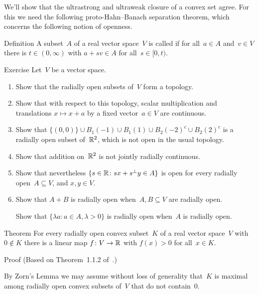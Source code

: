 \documentclass[a]{subfiles}
\begin{document}
\begin{parsec}%
\begin{point}%
We'll show that the ultrastrong and ultraweak closure
of a convex set agree. 
For this we need the following proto-Hahn--Banach separation theorem,
which concerns the following notion of openness.
\end{point}
\begin{point}{Definition}%
A subset~$A$ of a real vector space~$V$ 
is called 
if for all~$a\in A$ and~$v\in V$
there is $t\in (0,\infty)$
with $a+sv\in A$ for all~$s\in [0,t)$.
\end{point}
\begin{point}{Exercise}%
Let~$V$ be a vector space.
\begin{enumerate}
\item
Show that the radially open subsets of~$V$ form a topology.
\item
Show that with respect to this topology,
scalar multiplication and translations $x\mapsto x+a$
by a fixed vector~$a\in V$ are continuous.
\item
Show that $\{(0,0)\}\cup B_1(-1)\cup B_1(1)\cup B_2(-2)^c\cup B_2(2)^c$
is a radially open subset of~$\mathbb{R}^2$, 
which is not open
in the usual topology.


\item
Show that addition on~$\mathbb{R}^2$ is not jointly radially continuous.
\item
Show that nevertheless $\{s\in \mathbb{R} \colon sx+s^\perp y\in A\}$
is open for every radially open~$A\subseteq V$, and $x,y\in V$.
\item
Show that $A+B$ is radially open when~$A,B\subseteq V$ are radially open.

Show that $\{\lambda a\colon a\in A,\lambda>0\}$ is radially open
when~$A$ is radially open.
\end{enumerate}
\end{point}
\begin{point}{Theorem}%
For every radially open
convex subset~$K$ of a real vector space~$V$
with~$0\notin K$
there is a linear map $f\colon V\to\mathbb{R}$
with $f(x)>0$ for all~$x\in K$.
\begin{point}{Proof}%
(Based on Theorem~1.1.2 of~\cite{kr}.)

By Zorn's Lemma we may assume without loss of generality that~$K$ is maximal
among radially open convex subsets of~$V$ that do not contain~$0$.


\end{point}
\end{point}
\end{parsec}
\end{document}
